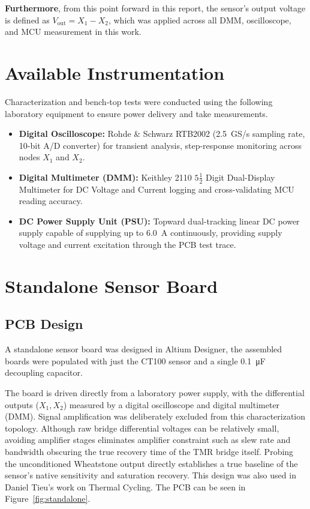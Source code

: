 \documentclass[12pt,a4paper]{article}
\begin{document}
\textbf{Furthermore}, from this point forward in this report, the sensor's output voltage is defined as \textbf{$V_{\text{out}} = X_1 - X_2$}, which was applied  across all DMM, oscilloscope, and MCU measurement in this work.


\section{Available Instrumentation}
\label{sec:instrumentation}

Characterization and bench-top tests were conducted using the following laboratory equipment to ensure power delivery and take measurements.

\begin{itemize}
    \item \textbf{Digital Oscilloscope:} Rohde \& Schwarz RTB2002 (\SI{2.5}{GS/s} sampling rate, 10-bit A/D converter) for transient analysis, step-response monitoring across nodes \(X_1\) and \(X_2\).
    \item \textbf{ Digital Multimeter (DMM):} Keithley 2110 \(5\frac{1}{2}\) Digit Dual-Display Multimeter for DC Voltage and Current logging and cross-validating MCU reading accuracy.
    
    \item \textbf{DC Power Supply Unit (PSU):} Topward dual-tracking linear DC power supply capable of supplying up to \SI{6.0}{\ampere} continuously, providing supply voltage  and current excitation through the PCB test trace.
    
    \end{itemize}

\section{Standalone Sensor Board}
\label{sec:standalone-board}

\subsection{PCB Design}
\label{sec:standalone-pcb}

A standalone sensor board was designed in Altium Designer, the assembled boards were populated with just the CT100 sensor and a single \SI{0.1}{\micro\farad} decoupling capacitor.

The board is driven directly from a laboratory power supply, with the  differential outputs ($X_1, X_2$) measured by a digital oscilloscope and digital multimeter (DMM). Signal amplification was deliberately excluded from this characterization topology. Although raw bridge differential voltages can be relatively small, avoiding amplifier stages eliminates amplifier constraint such as slew rate and  bandwidth obscuring the true recovery time of the TMR bridge itself. Probing the unconditioned Wheatstone output directly establishes a true baseline of the sensor's native sensitivity and saturation recovery. This design was also used in Daniel Tieu's work on Thermal Cycling. The PCB can be seen in Figure~\ref{fig:standalone}.
\end{document}
